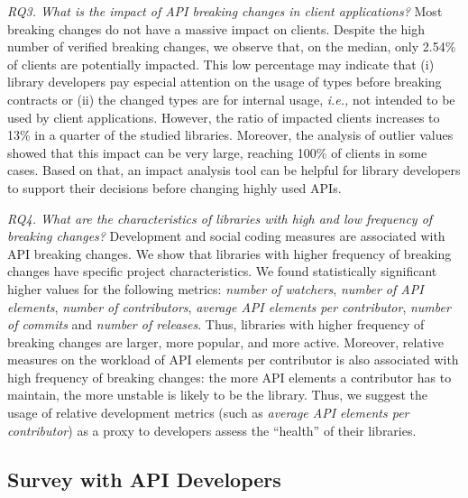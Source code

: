 \documentclass[11pt, a4paper]{article}
\newcommand{\ie}{\emph{i.e.,}\xspace}
\begin{document}
\noindent\emph{RQ3. What is the impact of API breaking changes in client applications?} 
Most breaking changes do not have a massive impact on clients.
Despite the high number of verified breaking changes, we observe that, on the median, only 2.54\% of clients are potentially impacted.
This low percentage may indicate that 
(i) library developers pay especial attention on the usage of types before breaking contracts or 
(ii) the changed types are for internal usage, \ie not intended to be used by client applications.  
However, the ratio of impacted clients increases to 13\% in a quarter of the studied libraries.
Moreover, the analysis of outlier values showed that this impact can be very large, reaching 100\% of clients in some cases.
Based on that, an impact analysis tool can be helpful for library developers to support their decisions before changing highly used APIs.

\vspace{0.2cm}

\noindent\emph{RQ4. What are the characteristics of libraries with high and low frequency of breaking changes?}
Development and social coding measures are associated with API breaking changes. 
We show that libraries with higher frequency of breaking changes have specific project characteristics.
We found statistically significant higher values for the following metrics: \emph{number of watchers}, \emph{number of API elements}, \emph{number of contributors}, \emph{average API elements per contributor}, \emph{number of commits} and \emph{number of releases}.
Thus, libraries with higher frequency of breaking changes are larger, more popular, and more active.
Moreover, relative measures on the workload of API elements per contributor is also associated with high frequency of breaking changes: the more API elements a contributor has to maintain, the more unstable is likely to be the library.
Thus, we suggest the usage of relative development metrics (such as \emph{average API elements per contributor}) as a proxy to developers assess the ``health'' of their libraries.

\subsection{Survey with API Developers}
\label{subsec:era}
\end{document}
